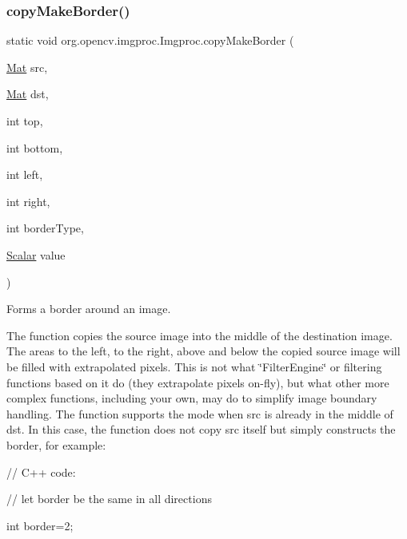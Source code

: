 \subsubsection{\texorpdfstring{copy\+Make\+Border()}{copyMakeBorder()}\hspace{0.1cm}{\footnotesize\ttfamily [1/2]}}
{\footnotesize\ttfamily static void org.\+opencv.\+imgproc.\+Imgproc.\+copy\+Make\+Border (\begin{DoxyParamCaption}\item[{\mbox{\hyperlink{classorg_1_1opencv_1_1core_1_1_mat}{Mat}}}]{src,  }\item[{\mbox{\hyperlink{classorg_1_1opencv_1_1core_1_1_mat}{Mat}}}]{dst,  }\item[{int}]{top,  }\item[{int}]{bottom,  }\item[{int}]{left,  }\item[{int}]{right,  }\item[{int}]{border\+Type,  }\item[{\mbox{\hyperlink{classorg_1_1opencv_1_1core_1_1_scalar}{Scalar}}}]{value }\end{DoxyParamCaption})\hspace{0.3cm}{\ttfamily [static]}}

Forms a border around an image.

The function copies the source image into the middle of the destination image. The areas to the left, to the right, above and below the copied source image will be filled with extrapolated pixels. This is not what \char`\"{}\+Filter\+Engine\char`\"{} or filtering functions based on it do (they extrapolate pixels on-\/fly), but what other more complex functions, including your own, may do to simplify image boundary handling. The function supports the mode when {\ttfamily src} is already in the middle of {\ttfamily dst}. In this case, the function does not copy {\ttfamily src} itself but simply constructs the border, for example\+: {\ttfamily }

{\ttfamily }

{\ttfamily }

{\ttfamily // C++ code\+:}

{\ttfamily }

{\ttfamily }

{\ttfamily // let border be the same in all directions}

{\ttfamily }

{\ttfamily }

{\ttfamily int border=2;}


